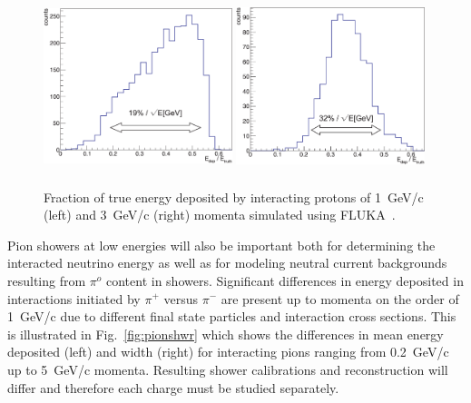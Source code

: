\begin{description}
\begin{figure}[h!]
\includegraphics[width=0.49\textwidth,height=5.0cm]{figures/pr1GeV_v2a}
\includegraphics[width=0.49\textwidth,height=5.0cm]{figures/pr3GeV_v2a}
  \caption{Fraction of true energy deposited by interacting protons of 1~GeV/c (left) and
3~GeV/c (right) momenta simulated using FLUKA~\cite{fluka05}.
}
\label{fig:hadronshwr}
\end{figure}

Pion showers at low energies will also be important both for determining the interacted neutrino energy as well
as for modeling neutral current backgrounds resulting from $\pi^o$ content in showers. Significant
 differences in energy deposited in interactions initiated
by $\pi^+$ versus $\pi^-$  are present up to momenta on the order of 1~GeV/c due to different
final state particles and interaction cross sections. This is illustrated in 
Fig.~\ref{fig:pionshwr} which shows the differences in mean energy deposited (left) and width (right) 
for interacting pions ranging from 0.2~GeV/c up to 5~GeV/c momenta.
Resulting shower calibrations and reconstruction will differ and therefore each charge must be 
studied separately.

\begin{figure}[h!]
  \centering


\end{figure}
\end{description}
